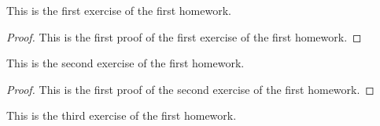 \begin{exercise}
    This is the first exercise of the first homework.
\end{exercise}
\begin{proof}
    This is the first proof of the first exercise of the first homework.
\end{proof}

\begin{exercise}
    This is the second exercise of the first homework.
\end{exercise}

\begin{proof}
    This is the first proof of the second exercise of the first homework.
\end{proof}

\begin{exercise}
    This is the third exercise of the first homework.
\end{exercise}